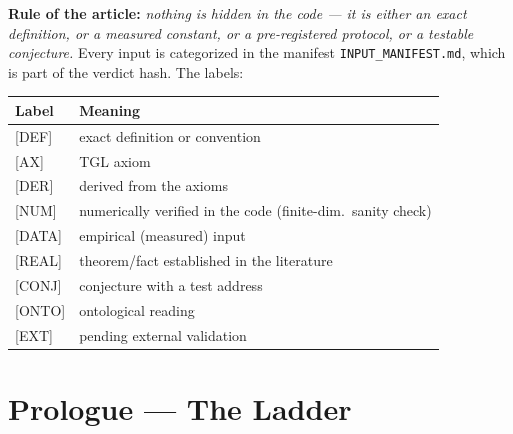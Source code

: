 \documentclass[11pt]{article}
\theoremstyle{definition}\newtheorem{deriv}{Derivation}
\begin{document}
\noindent\textbf{Rule of the article:} \emph{nothing is hidden in the code --- it is either an exact definition, or a measured constant, or a pre-registered protocol, or a testable conjecture.} Every input is categorized in the manifest \texttt{INPUT\_MANIFEST.md}, which is part of the verdict hash. The labels:

\begin{center}\small\begin{tabular}{ll}\toprule

Label & Meaning\\\midrule

\textsf{[DEF]} & exact definition or convention\\

\textsf{[AX]} & TGL axiom\\

\textsf{[DER]} & derived from the axioms\\

\textsf{[NUM]} & numerically verified in the code (finite-dim.\ sanity check)\\

\textsf{[DATA]} & empirical (measured) input\\

\textsf{[REAL]} & theorem/fact established in the literature\\

\textsf{[CONJ]} & conjecture with a test address\\

\textsf{[ONTO]} & ontological reading\\

\textsf{[EXT]} & pending external validation\\\bottomrule

\end{tabular}\end{center}

\section*{Prologue --- The Ladder}
\end{document}
